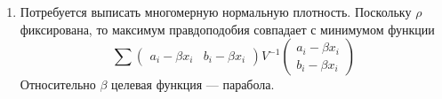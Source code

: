 \begin{enumerate}
\begin{enumerate}
    \item Потребуется выписать многомерную нормальную плотность.
    Поскольку $\rho$ фиксирована, то максимум правдоподобия совпадает с минимумом функции
    \[
       \sum \begin{pmatrix} a_i - \beta x_i & b_i - \beta x_i \end{pmatrix} V^{-1} \begin{pmatrix} a_i - \beta x_i \\ b_i - \beta x_i \end{pmatrix}
    \]
    Относительно $\beta$ целевая функция — парабола.
\end{enumerate}

        
\end{enumerate}
